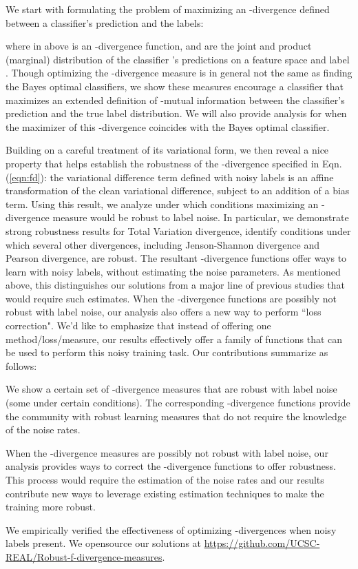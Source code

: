 \documentclass{article}
\newcommand{\squishlist}{
\begin{list}{{{\small{}}}}
{\setlength{\itemsep}{3pt}      \setlength{\parsep}{1pt}
\setlength{\topsep}{1pt}       \setlength{\partopsep}{0pt}
\setlength{\leftmargin}{1em} \setlength{\labelwidth}{1em}
\setlength{\labelsep}{0.5em} } }
\newcommand{\squishend}{  \end{list}  }
\begin{document}
We start with formulating the problem of maximizing an -divergence defined between a classifier's prediction and the labels:

where in above  is an -divergence function,  and  are the joint and product (marginal) distribution of the classifier 's predictions on a feature space  and label . Though optimizing the -divergence measure is in general not the same as finding the Bayes optimal classifiers, we show these measures encourage a classifier that maximizes an extended definition of -mutual information between the classifier's prediction and the true label distribution. We will also provide analysis for when the maximizer of this -divergence coincides with the Bayes optimal classifier.


Building on a careful treatment of its variational form, we then reveal a nice property that helps establish the robustness of the -divergence specified in Eqn. (\ref{eqn:fd}): the variational difference term defined with noisy labels is an affine transformation of the clean variational difference, subject to an addition of a bias term. Using this result, we analyze under which conditions maximizing an -divergence measure would be robust to label noise. In particular, we demonstrate strong robustness results for Total Variation divergence, identify conditions under which several other divergences, including Jenson-Shannon divergence and Pearson  divergence, are robust.  The resultant -divergence functions offer ways to learn with noisy labels, without estimating the noise parameters. As mentioned above, this distinguishes our solutions from a major line of previous studies that would require such estimates. When the -divergence functions are possibly not robust with label noise, our analysis also offers a new way to perform ``loss correction". We'd like to emphasize that instead of offering one method/loss/measure, our results effectively offer a family of functions that can be used to perform this noisy training task. Our contributions summarize as follows:
\squishlist    
\item We show a certain set of -divergence measures that are robust with label noise (some under certain conditions). The corresponding -divergence functions provide the community with robust learning measures that do not require the knowledge of the noise rates. 
    \item When the -divergence measures are possibly not robust with label noise, our analysis provides ways to correct the -divergence functions to offer robustness.
    This process would require the estimation of the noise rates and our results contribute new ways to leverage existing estimation techniques to make the training more robust. 
    \item We empirically verified the effectiveness of optimizing -divergences when noisy labels present. We opensource our solutions at  \url{https://github.com/UCSC-REAL/Robust-f-divergence-measures}.
    \squishend
\end{document}
